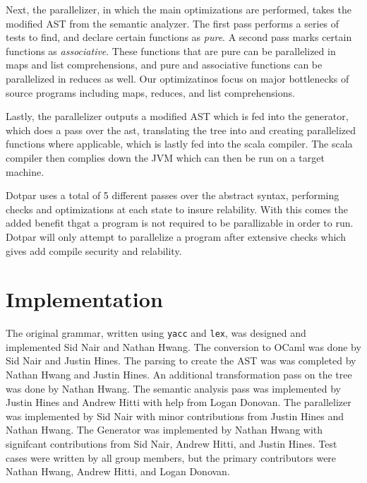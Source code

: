 Next, the parallelizer, in which the main optimizations are performed, takes
the modified AST from the semantic analyzer. The first pass
performs a series of tests to find, and declare certain functions as
\emph{pure}. A second pass marks certain functions as \emph{associative}.
These functions that are pure can be parallelized in maps and list
comprehensions, and pure and associative functions can be parallelized in
reduces as well. Our optimizatinos focus on major bottlenecks of source programs
including maps, reduces, and list comprehensions.

Lastly, the parallelizer outputs a modified AST which is fed into the generator, 
which does a pass over the ast, translating the tree into and creating parallelized 
functions where applicable, which is lastly fed into the scala compiler.  The
scala compiler then complies down the JVM which can then be run on a target machine.

Dotpar uses a total of 5 different passes over the abstract syntax, performing 
checks and optimizations at each state to insure relability.  With this comes
the added benefit thgat a program is not required to be parallizable in order to run.  Dotpar
will only attempt to parallelize a program after extensive checks which gives add 
compile security and relability.

\section{Implementation}
The original grammar, written using \verb=yacc= and \verb=lex=, was designed and
implemented Sid Nair and Nathan Hwang. The conversion to OCaml was done by Sid
Nair and Justin Hines. The parsing to create the AST was was completed by
Nathan Hwang and Justin Hines. An additional transformation pass on the tree was
done by Nathan Hwang. The semantic analysis pass was implemented by Justin
Hines and Andrew Hitti with help from Logan Donovan. The parallelizer was implemented by Sid Nair with minor
contributions from Justin Hines and Nathan Hwang. The Generator was implemented
by Nathan Hwang with signifcant contributions from Sid Nair, Andrew Hitti, and
Justin Hines. Test cases were written by all group members, but the primary
contributors were Nathan Hwang, Andrew Hitti, and Logan Donovan.
